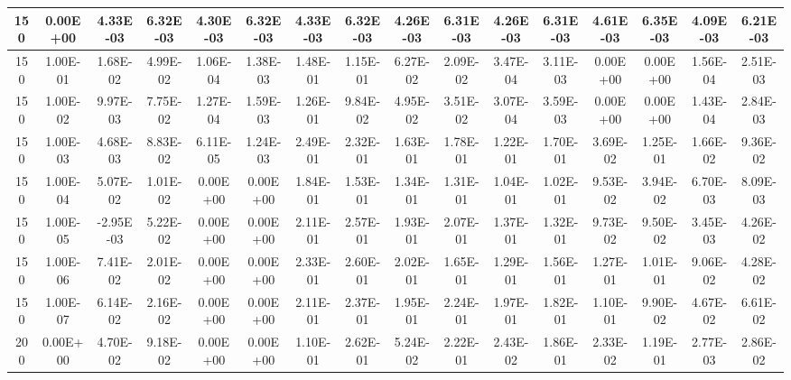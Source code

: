 \begin{table}[H]
\begin{center}
{\begin{tabular}{|c|c|c|c|c|c|c|c|c|c|c|c|c|c|c|c|}
150    &    0.00E+00    &    4.33E-03    &    6.32E-03    &    4.30E-03    &    6.32E-03    &    4.33E-03    &    6.32E-03    &    4.26E-03    &    6.31E-03    &    4.26E-03    &    6.31E-03    &    4.61E-03    &    6.35E-03    &    4.09E-03    &    6.21E-03    \\ \hline
150    &    1.00E-01    &    1.68E-02    &    4.99E-02    &    1.06E-04    &    1.38E-03    &    1.48E-01    &    1.15E-01    &    6.27E-02    &    2.09E-02    &    3.47E-04    &    3.11E-03    &    0.00E+00    &    0.00E+00    &    1.56E-04    &    2.51E-03    \\ \hline
150    &    1.00E-02    &    9.97E-03    &    7.75E-02    &    1.27E-04    &    1.59E-03    &    1.26E-01    &    9.84E-02    &    4.95E-02    &    3.51E-02    &    3.07E-04    &    3.59E-03    &    0.00E+00    &    0.00E+00    &    1.43E-04    &    2.84E-03    \\ \hline
150    &    1.00E-03    &    4.68E-03    &    8.83E-02    &    6.11E-05    &    1.24E-03    &    2.49E-01    &    2.32E-01    &    1.63E-01    &    1.78E-01    &    1.22E-01    &    1.70E-01    &    3.69E-02    &    1.25E-01    &    1.66E-02    &    9.36E-02    \\ \hline
150    &    1.00E-04    &    5.07E-02    &    1.01E-02    &    0.00E+00    &    0.00E+00    &    1.84E-01    &    1.53E-01    &    1.34E-01    &    1.31E-01    &    1.04E-01    &    1.02E-01    &    9.53E-02    &    3.94E-02    &    6.70E-03    &    8.09E-03    \\ \hline
150    &    1.00E-05    &    -2.95E-03    &    5.22E-02    &    0.00E+00    &    0.00E+00    &    2.11E-01    &    2.57E-01    &    1.93E-01    &    2.07E-01    &    1.37E-01    &    1.32E-01    &    9.73E-02    &    9.50E-02    &    3.45E-03    &    4.26E-02    \\ \hline
150    &    1.00E-06    &    7.41E-02    &    2.01E-02    &    0.00E+00    &    0.00E+00    &    2.33E-01    &    2.60E-01    &    2.02E-01    &    1.65E-01    &    1.29E-01    &    1.56E-01    &    1.27E-01    &    1.01E-01    &    9.06E-02    &    4.28E-02    \\ \hline
150    &    1.00E-07    &    6.14E-02    &    2.16E-02    &    0.00E+00    &    0.00E+00    &    2.11E-01    &    2.37E-01    &    1.95E-01    &    2.24E-01    &    1.97E-01    &    1.82E-01    &    1.10E-01    &    9.90E-02    &    4.67E-02    &    6.61E-02    \\ \hline
200    &    0.00E+00    &    4.70E-02    &    9.18E-02    &    0.00E+00    &    0.00E+00    &    1.10E-01    &    2.62E-01    &    5.24E-02    &    2.22E-01    &    2.43E-02    &    1.86E-01    &    2.33E-02    &    1.19E-01    &    2.77E-03    &    2.86E-02    \\ \hline

\end{tabular}}
\end{center}
\end{table}
